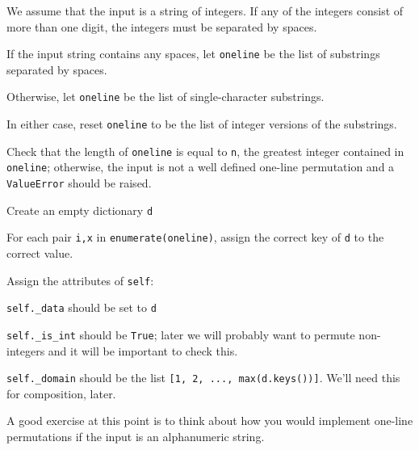 \documentclass[m3380-lec-main.tex]{subfiles}
\begin{document}
\begin{alg} We assume that the input is a string of integers. If any of the integers consist of more than one digit, the integers must be separated by spaces.
\begin{enum}
\item If the input string contains any spaces, let \verb|oneline| be the list of substrings separated by spaces.
\item Otherwise, let \verb|oneline| be the list of single-character substrings.
\item In either case, reset \verb|oneline| to be the list of integer versions of the substrings.
\item Check that the length of \verb|oneline| is equal to \verb|n|, the greatest integer contained in \verb|oneline|; otherwise, the input is not a well defined one-line permutation and a \verb|ValueError| should be raised.
\item Create an empty dictionary \verb|d|
\item For each pair \verb|i,x| in \verb|enumerate(oneline)|, assign the correct key of \verb|d| to the correct value.
\item Assign the attributes of \verb|self|:
\begin{enuma}
\item \verb|self._data| should be set to \verb|d|
\item \verb|self._is_int| should be \verb|True|; later we will probably want to permute non-integers and it will be important to check this.
\item \verb|self._domain| should be the list \verb|[1, 2, ..., max(d.keys())]|. We'll need this for composition, later.
\end{enuma}
\end{enum}
\end{alg}

A good exercise at this point is to think about how you would implement one-line permutations if the input is an alphanumeric string.
\end{document}
